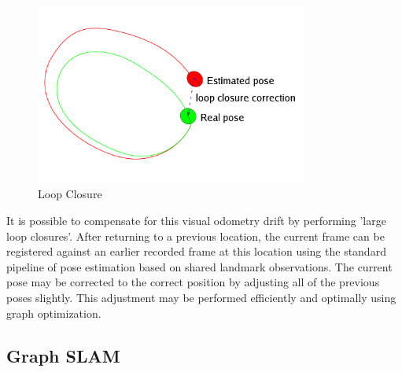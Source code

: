 \begin{figure}[h!]
  \centering
    \includegraphics[width=0.8\textwidth]{chapters/images/loop-closure}
  \caption{Loop Closure}
\end{figure}

It is possible to compensate for this visual odometry drift by performing 'large loop closures'. 
After returning to a previous location, the current frame can be registered against an earlier
recorded frame at this location using the standard pipeline of pose estimation based on shared
landmark observations.  The current pose may be corrected to the correct position by adjusting all
of the previous poses slightly.  This adjustment may be performed efficiently and optimally using
graph optimization.

\subsection{Graph SLAM}
\label{subsec:graph_slam}
